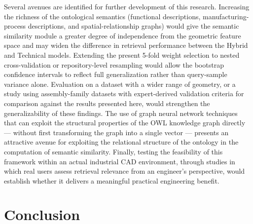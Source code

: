 \documentclass[preprint,12pt]{elsarticle}
\begin{document}
Several avenues are identified for further development of this research.
Increasing the richness of the ontological semantics (functional descriptions, manufacturing-process descriptions, and spatial-relationship graphs) would give the semantic similarity module a greater degree of independence from the geometric feature space and may widen the difference in retrieval performance between the Hybrid and Technical models.
Extending the present 5-fold weight selection to nested cross-validation or repository-level resampling would allow the bootstrap confidence intervals to reflect full generalization rather than query-sample variance alone.
Evaluation on a dataset with a wider range of geometry, or a study using assembly-family datasets with expert-derived validation criteria for comparison against the results presented here, would strengthen the generalizability of these findings.
The use of graph neural network techniques that can exploit the structural properties of the OWL knowledge graph directly --- without first transforming the graph into a single vector --- presents an attractive avenue for exploiting the relational structure of the ontology in the computation of semantic similarity.
Finally, testing the feasibility of this framework within an actual industrial CAD environment, through studies in which real users assess retrieval relevance from an engineer's perspective, would establish whether it delivers a meaningful practical engineering benefit.


\section{Conclusion}
\end{document}

